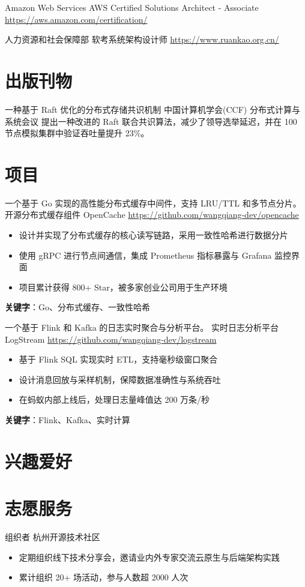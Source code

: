 \documentclass[a4paper, serif, 10pt]{moderncv}
\begin{document}
        {Amazon Web Services}
        {AWS Certified Solutions Architect - Associate}
        {\url{https://aws.amazon.com/certification/}}
        {}
        {}

        {人力资源和社会保障部}
        {软考系统架构设计师}
        {\url{https://www.ruankao.org.cn/}}
        {}
        {}
\section{出版刊物}

        {一种基于 Raft 优化的分布式存储共识机制}
        {中国计算机学会(CCF) 分布式计算与系统会议}
        {}
        {}
        {提出一种改进的 Raft 联合共识算法，减少了领导选举延迟，并在 100 节点模拟集群中验证吞吐量提升 23\%。}
\section{项目}

        {一个基于 Go 实现的高性能分布式缓存中间件，支持 LRU/TTL 和多节点分片。}
        {开源分布式缓存组件 OpenCache}
        {\url{https://github.com/wangqiang-dev/opencache}}
        {}
        {\begin{itemize}
\item 设计并实现了分布式缓存的核心读写链路，采用一致性哈希进行数据分片
\item 使用 gRPC 进行节点间通信，集成 Prometheus 指标暴露与 Grafana 监控界面
\item 项目累计获得 800+ Star，被多家创业公司用于生产环境
\end{itemize}
\textbf{关键字}：Go、分布式缓存、一致性哈希}

        {一个基于 Flink 和 Kafka 的日志实时聚合与分析平台。}
        {实时日志分析平台 LogStream}
        {\url{https://github.com/wangqiang-dev/logstream}}
        {}
        {\begin{itemize}
\item 基于 Flink SQL 实现实时 ETL，支持毫秒级窗口聚合
\item 设计消息回放与采样机制，保障数据准确性与系统吞吐
\item 在蚂蚁内部上线后，处理日志量峰值达 200 万条/秒
\end{itemize}
\textbf{关键字}：Flink、Kafka、实时计算}
\section{兴趣爱好}

\section{志愿服务}

        {组织者}
        {杭州开源技术社区}
        {}
        {}
        {\begin{itemize}
\item 定期组织线下技术分享会，邀请业内外专家交流云原生与后端架构实践
\item 累计组织 20+ 场活动，参与人数超 2000 人次
\end{itemize}}
    
\end{document}
